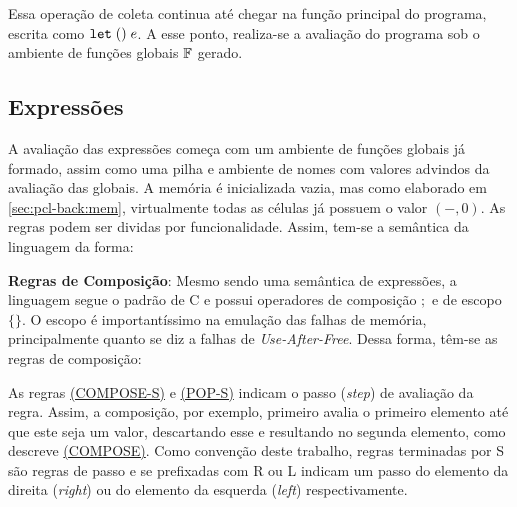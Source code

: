 Essa operação de coleta continua até chegar na função principal do programa, escrita como $\texttt{let}\;()\; e$. A esse ponto, realiza-se a avaliação do programa sob o ambiente de funções globais $\mathbb{F}$ gerado. 

\subsection{Expressões}

A avaliação das expressões começa com um ambiente de funções globais já formado, assim como uma pilha e ambiente de nomes com valores advindos da avaliação das globais. A memória é inicializada vazia, mas como elaborado em \ref{sec:pcl-back:mem}, virtualmente todas as células já possuem o valor $(-, 0)$.  As regras podem ser dividas por funcionalidade. Assim, tem-se a semântica da linguagem da forma:

\textbf{Regras de Composição}: Mesmo sendo uma semântica de expressões, a linguagem segue o padrão de C e possui operadores de composição $;$ e de escopo $\{\}$. O escopo é importantíssimo na emulação das falhas de memória, principalmente quanto se diz a falhas de \emph{Use-After-Free}. Dessa forma, têm-se as regras de composição:






As regras \hyperref[rule:pop-s]{(COMPOSE-S)} e \hyperref[rule:compose-s]{(POP-S)} indicam o passo (\emph{step}) de avaliação da regra. Assim, a composição, por exemplo, primeiro avalia o primeiro elemento até que este seja um valor, descartando esse e resultando no segunda elemento, como descreve \hyperref[rule:compose]{(COMPOSE)}. Como convenção deste trabalho, regras terminadas por S são regras de passo e se prefixadas com R ou L indicam um passo do elemento da direita (\emph{right}) ou do elemento da esquerda (\emph{left}) respectivamente.

